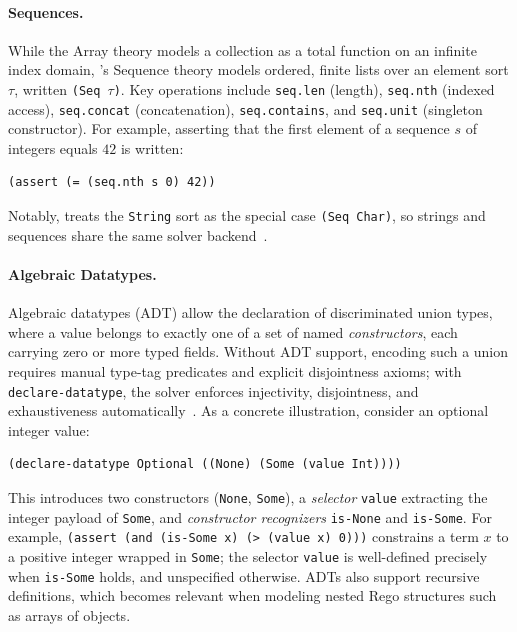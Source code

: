 \paragraph{Sequences.}
While the Array theory models a collection as a total function on an infinite index
domain, \ziii's Sequence theory models ordered, finite lists over an element sort
$\tau$, written \texttt{(Seq $\tau$)}.
Key operations include \texttt{seq.len} (length), \texttt{seq.nth} (indexed access),
\texttt{seq.concat} (concatenation), \texttt{seq.contains}, and \texttt{seq.unit}
(singleton constructor).
For example, asserting that the first element of a sequence $s$ of integers equals
$42$ is written:
\begin{lstlisting}[language=SMT]
(assert (= (seq.nth s 0) 42))
\end{lstlisting}
Notably, \ziii treats the \texttt{String} sort as the special case
\texttt{(Seq Char)}, so strings and sequences share the same solver
backend~\cite{smt:sequences}.

\paragraph{Algebraic Datatypes.}
Algebraic datatypes (ADT) allow the declaration of discriminated union types,
where a value belongs to exactly one of a set of named \emph{constructors}, each
carrying zero or more typed fields.
Without ADT support, encoding such a union requires manual type-tag predicates and
explicit disjointness axioms; with \texttt{declare-datatype}, the solver enforces
injectivity, disjointness, and exhaustiveness automatically~\cite{smt:adt-decision}.
As a concrete illustration, consider an optional integer value:
\begin{lstlisting}[language=SMT]
(declare-datatype Optional ((None) (Some (value Int))))
\end{lstlisting}
This introduces two constructors (\texttt{None}, \texttt{Some}), a \emph{selector}
\texttt{value} extracting the integer payload of \texttt{Some}, and
\emph{constructor recognizers} \texttt{is-None} and \texttt{is-Some}.
For example, \texttt{(assert (and (is-Some x) (> (value x) 0)))} constrains a term
$x$ to a positive integer wrapped in \texttt{Some}; the selector \texttt{value} is
well-defined precisely when \texttt{is-Some} holds, and unspecified otherwise.
ADTs also support recursive definitions, which becomes relevant when modeling nested
Rego structures such as arrays of objects.


